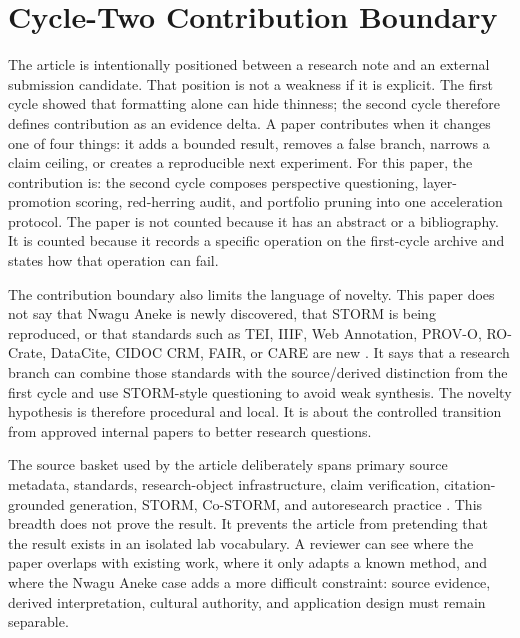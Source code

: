 \documentclass[sigconf,nonacm]{acmart}
\begin{document}
\section{Cycle-Two Contribution Boundary}
The article is intentionally positioned between a research note and an external
submission candidate. That position is not a weakness if it is explicit. The
first cycle showed that formatting alone can hide thinness; the second cycle
therefore defines contribution as an evidence delta. A paper contributes when it
changes one of four things: it adds a bounded result, removes a false branch,
narrows a claim ceiling, or creates a reproducible next experiment. For this
paper, the contribution is: the second cycle composes perspective questioning, layer-promotion scoring, red-herring audit, and portfolio pruning into one acceleration protocol. The paper is not counted because it has an
abstract or a bibliography. It is counted because it records a specific
operation on the first-cycle archive and states how that operation can fail.

The contribution boundary also limits the language of novelty. This paper does
not say that Nwagu Aneke is newly discovered, that STORM is being reproduced, or
that standards such as TEI, IIIF, Web Annotation, PROV-O, RO-Crate, DataCite,
CIDOC CRM, FAIR, or CARE are new \cite{teiP5Glyphs,iiifPresentation3,w3cAnnotationModel,w3cAnnotationVocab,w3cProvO,rocrate12,cidocCrm,datacite45,wilkinson2016fair,carroll2020care}. It says that a research
branch can combine those standards with the source/derived distinction from the
first cycle and use STORM-style questioning to avoid weak synthesis. The novelty
hypothesis is therefore procedural and local. It is about the controlled
transition from approved internal papers to better research questions.

The source basket used by the article deliberately spans primary source
metadata, standards, research-object infrastructure, claim verification,
citation-grounded generation, STORM, Co-STORM, and autoresearch practice
\cite{azuonye1992,omniglotNwagu,unicodeAfricanScripts2023,scriptSourceNwagu,sirisNwaguProposal,teiP5Glyphs,iiifPresentation3,w3cAnnotationModel,w3cAnnotationVocab,w3cProvO,rocrate12,cidocCrm,datacite45,wilkinson2016fair,carroll2020care,wadden2020scifact,gao2023alce,karpathyAutoresearch,shao2024storm,jiang2024costorm,acmSubmissions,arxivSubmitTex}. This breadth does not prove the result. It prevents the article
from pretending that the result exists in an isolated lab vocabulary. A
reviewer can see where the paper overlaps with existing work, where it only
adapts a known method, and where the Nwagu Aneke case adds a more difficult
constraint: source evidence, derived interpretation, cultural authority, and
application design must remain separable.
\end{document}
